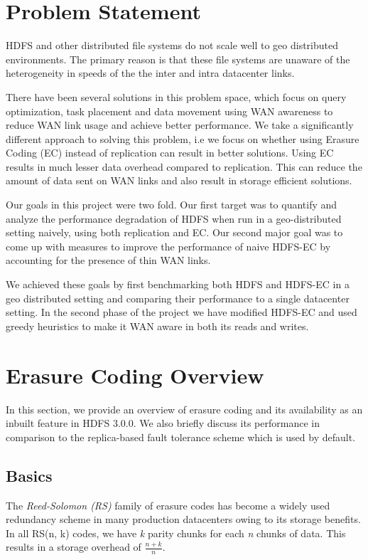 \documentclass{sig-alternate-05-2015}
\begin{document}
\maketitle
\section{Problem Statement}
HDFS and other distributed file systems do not scale well to geo distributed environments. The primary reason is that these file systems are unaware of the heterogeneity in speeds of the the inter and intra datacenter links.

There have been several solutions in this problem space, which focus on query optimization, task placement and data movement using WAN awareness to reduce WAN link usage and achieve better performance.  We take a significantly different approach to solving this problem, i.e we focus on whether using Erasure Coding (EC) instead of replication can result in better solutions. Using EC results in much lesser data overhead compared to replication. This can reduce the amount of data sent on WAN links and also result in storage efficient solutions.

Our goals in this project were two fold. Our first target was to quantify and analyze the performance degradation of HDFS when run in a geo-distributed setting naively, using both replication and EC. Our second major goal was to come up with measures to improve the performance of naive HDFS-EC by accounting for the presence of thin WAN links.

We achieved these goals by first benchmarking both HDFS and HDFS-EC in a geo distributed setting and comparing their performance to a single datacenter setting. In the second phase of the project we have modified HDFS-EC and used greedy heuristics to make it WAN aware in both its reads and writes.

\printccsdesc



\section{Erasure Coding Overview}
In this section, we provide an overview of erasure coding and its availability as an inbuilt feature in HDFS 3.0.0. We also briefly discuss its performance in comparison to the replica-based fault tolerance scheme which is used by default.

\subsection{Basics}
The \emph{Reed-Solomon (RS)} family of erasure codes has become a widely used redundancy scheme in many production datacenters owing to its storage benefits. In all RS(n, k) codes, we have \emph{k} parity chunks for each \emph{n} chunks of data. This results in a storage overhead of \( \frac{n+k}{n} \).  
\end{document}
